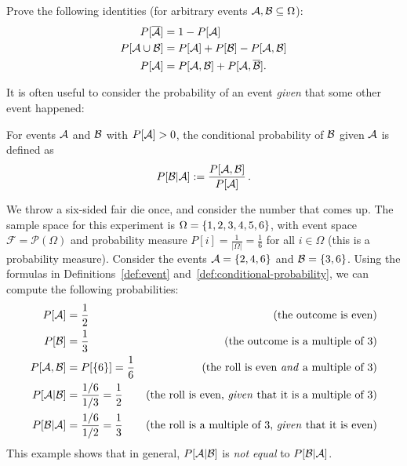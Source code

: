 \begin{exercise}
Prove the following identities (for arbitrary events $\mathcal{A}, \mathcal{B} \subseteq \Omega$):
\setlength{\abovedisplayskip}{0pt}
\setlength{\belowdisplayskip}{0pt}
\setlength{\abovedisplayshortskip}{0pt}
\setlength{\belowdisplayshortskip}{0pt}
\begin{align}
P[\overline{\mathcal{A}}] &= 1 - P[\mathcal{A}]\\
P[\mathcal{A} \cup \mathcal{B}] &= P[\mathcal{A}] + P[\mathcal{B}] - P[\mathcal{A}, \mathcal{B}]\\
P[\mathcal{A}] &= P[\mathcal{A}, \mathcal{B}] + P[\mathcal{A}, \overline{\mathcal{B}}].
\end{align}
\end{exercise}
It is often useful to consider the probability of an event \emph{given} that some other event happened:
\begin{definition}\label{def:conditional-probability}
For events $\mathcal{A}$ and $\mathcal{B}$ with $P[\mathcal{A}] > 0$, the conditional probability of $\mathcal{B}$ given $\mathcal{A}$ is defined as
\[
P[\mathcal{B} | \mathcal{A}] := \frac{P[\mathcal{A},\mathcal{B}]}{P[\mathcal{A}]} \, .
\]
\end{definition}
\begin{example}\label{ex:fair-die}
We throw a six-sided fair die once, and consider the number that comes
up. The sample space for this experiment is $\Omega =
\{1,2,3,4,5,6\}$, with event space $\mathcal{F} = \mathcal{P}(\Omega)$ and probability measure $P[i] =
\frac{1}{|\Omega|} = \frac{1}{6}$ for all $i \in \Omega$ (this is a
 probability measure). Consider the events $\mathcal{A} = \{2,4,6\}$ and $\mathcal{B} = \{3,6\}$.
Using the formulas in Definitions~\ref{def:event} and~\ref{def:conditional-probability}, we can compute the following probabilities:
\begin{align*}
P[\mathcal{A}] &= \frac{1}{2} &\mbox{(the outcome is even)}\\
P[\mathcal{B}] &= \frac{1}{3}&\mbox{(the outcome is a multiple of 3)}\\
P[\mathcal{A}, \mathcal{B}] &= P[\{6\}] = \frac{1}{6} & \mbox{(the roll is even \emph{and} a multiple of 3)}\\
P[\mathcal{A} | \mathcal{B}] &= \frac{1/6}{1/3} = \frac{1}{2} & \mbox{(the roll is even, \emph{given} that it is a multiple of 3)}\\
P[\mathcal{B} | \mathcal{A}] &= \frac{1/6}{1/2} = \frac{1}{3}& \mbox{(the roll is a multiple of 3, \emph{given} that it is even)}\\
\end{align*}
This example shows that in general, $P[\mathcal{A} | \mathcal{B}]$ is \emph{not
  equal} to $P[\mathcal{B} | \mathcal{A}]$.
\end{example}

